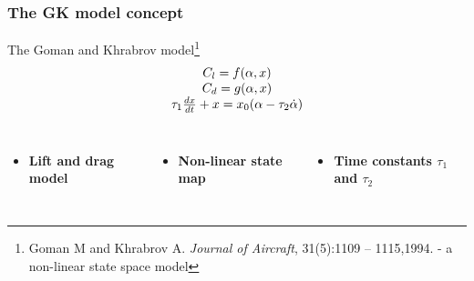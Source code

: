 \documentclass[compress]{beamer}
\begin{document}
\begin{frame}
  \frametitle{The GK model concept}
  The Goman and Khrabrov model\footnote{\tiny{Goman M and Khrabrov A. \emph{Journal of Aircraft}, 31(5):1109 – 1115,1994.} - a non-linear state space model}
  \begin{equation*}
    \begin{array}[c]{c}
      C_l= f(\alpha,x) \\
      C_d= g(\alpha,x) \\
      \tau_1 \frac{dx}{dt} +x = x_0(\alpha - \tau_2 \dot{\alpha}) 
    \end{array}
  \end{equation*}

  \begin{columns}[t] 
    \begin{itemize}
      \item   \textbf{Lift and drag model}
    \end{itemize}
    \begin{itemize}
      \item    \textbf{Non-linear state map}
    \end{itemize}
    \begin{itemize}
      \item \textbf{Time constants $\tau_1$ and $\tau_2$} 
    \end{itemize}
  \end{columns}


\end{frame}
\end{document}
